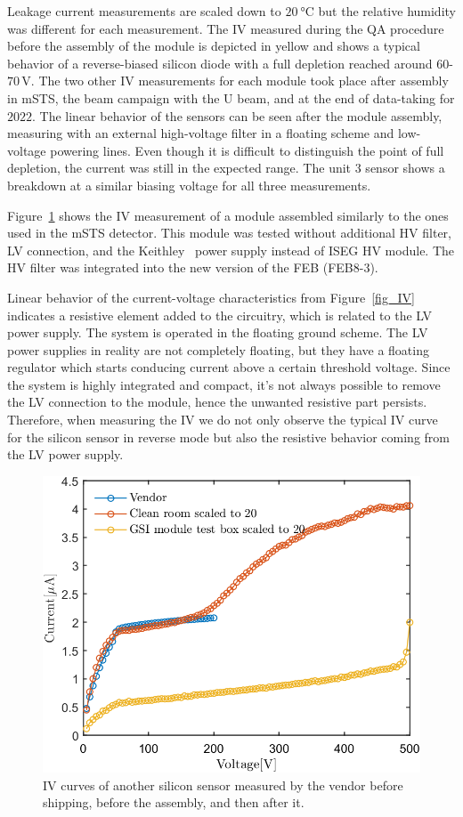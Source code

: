 Leakage current measurements are scaled down to $\SI{20}{\celsius}$ but the relative humidity was different for each measurement. The IV measured during the QA procedure before the assembly of the module is depicted in yellow and shows a typical behavior of a reverse-biased silicon diode with a full depletion reached around $60$-$70$\,V. The two other IV measurements for each module took place after assembly in \gls{mSTS}, the beam campaign with the U beam, and at the end of data-taking for $2022$. The linear behavior of the sensors can be seen after the module assembly, measuring with an external high-voltage filter in a floating scheme and low-voltage powering lines. Even though it is difficult to distinguish the point of full depletion, the current was still in the expected range. The unit 3 sensor shows a breakdown at a similar biasing voltage for all three measurements.


Figure~\ref{fig_IV_good} shows the IV measurement of a module assembled similarly to the ones used in the \gls{mSTS} detector. This module was tested without additional \gls{HV} filter, \gls{LV} connection, and the Keithley~\cite{Keithley} power supply instead of ISEG \gls{HV} module. The \gls{HV} filter was integrated into the new version of the \gls{FEB} (FEB8-3).


Linear behavior of the current-voltage characteristics from Figure~\ref{fig_IV} indicates a resistive element added to the circuitry, which is related to the \gls{LV} power supply. The system is operated in the floating ground scheme. The LV power supplies in reality are not completely floating, but they have a floating regulator which starts conducing current above a certain threshold voltage. Since the system is highly integrated and compact, it’s not always possible to remove the LV connection to the module, hence the unwanted resistive part persists. Therefore, when measuring the IV we do not only observe the typical IV curve for the silicon sensor in reverse mode but also the resistive behavior coming from the LV power supply.
\begin{figure}[!h]
\centering
\includegraphics[width=0.5\columnwidth]{Chapter6/DCS/images/IV/30304Whole.png}
\caption{IV curves of another silicon sensor measured by the vendor before shipping, before the assembly, and then after it.} 
\label{fig_IV_good}
\end{figure}
